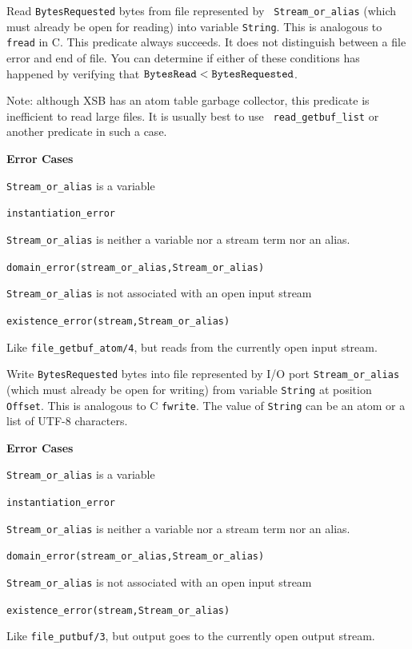 \begin{description}
Read {\tt BytesRequested} bytes from file represented by {\tt
Stream\_or\_alias} (which must already be open for reading) into
variable {\tt String}. This is analogous to {\tt fread} in C.  This
predicate always succeeds. It does not distinguish between a file
error and end of file.  You can determine if either of these
conditions has happened by verifying that $\tt BytesRead <
BytesRequested$.

Note: although XSB has an atom table garbage collector, this predicate
is inefficient to read large files.  It is usually best to use {\tt
  read\_getbuf\_list} or another predicate in such a case.

{\bf Error Cases} 
\bi
\item 	{\tt Stream\_or\_alias} is a variable
\bi
\item {\tt instantiation\_error}
\ei
\item 	{\tt Stream\_or\_alias} is neither a variable nor a stream term nor an alias.
\bi
\item 	{\tt domain\_error(stream\_or\_alias,Stream\_or\_alias)}
\ei
\item 	{\tt Stream\_or\_alias} is not associated with an open input stream
\bi
\item 	{\tt existence\_error(stream,Stream\_or\_alias)}
\ei
\ei

%
Like \verb|file_getbuf_atom/4|, but reads from the currently open input stream.


Write {\tt BytesRequested} bytes into file represented by I/O port
{\tt Stream\_or\_alias} (which must already be open for writing) from
variable {\tt String} at position {\tt Offset}. This is analogous to C
{\tt fwrite}.  The value of {\tt String} can be an atom or a list of
UTF-8 characters.

{\bf Error Cases} 
\bi
\item 	{\tt Stream\_or\_alias} is a variable
\bi
\item {\tt instantiation\_error}
\ei
\item 	{\tt Stream\_or\_alias} is neither a variable nor a stream term nor an alias.
\bi
\item 	{\tt domain\_error(stream\_or\_alias,Stream\_or\_alias)}
\ei
\item 	{\tt Stream\_or\_alias} is not associated with an open input stream
\bi
\item 	{\tt existence\_error(stream,Stream\_or\_alias)}
\ei
\ei

%
Like \verb|file_putbuf/3|, but output goes to the currently open output stream.


\end{description}


